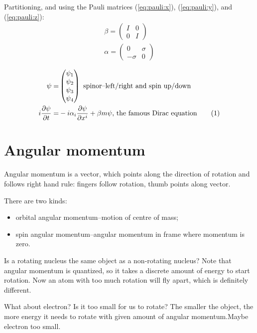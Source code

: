 \documentclass[]{article}
\newcommand\numberthis{\addtocounter{equation}{1}\tag{\theequation}}
\begin{document}
Partitioning, and using the Pauli matrices (\ref{eq:pauli:x}), (\ref{eq:pauli:y}), and (\ref{eq:pauli:z}):
\begin{align*}
	\beta = \begin{pmatrix}
		I&0\\
		0&I
	\end{pmatrix}\\
	\alpha = \begin{pmatrix}
		0&\sigma\\
		-\sigma&0
	\end{pmatrix}
\end{align*}

\begin{align*}
	\psi =& \begin{pmatrix}
		\psi_1\\
		\psi_2\\
		\psi_3\\
		\psi_4
	\end{pmatrix} \text{ spinor--left/right and spin up/down}\\
	i \frac{\partial \psi}{\partial t} =& -i \alpha_i \frac{\partial \psi}{\partial x^i} + \beta m \psi \text{, the famous Dirac equation} \numberthis \label{eq:famous:dirac}
\end{align*}


\section{Angular momentum}

Angular momentum is a vector, which points along the direction of rotation and follows right hand rule: fingers follow rotation, thumb points along vector.

There are two kinds:
\begin{itemize}
	\item orbital angular momentum--motion of centre of mass;
	\item spin angular momentum--angular momentum in frame where momentum is zero.
\end{itemize}

Is a rotating nucleus the same object as a non-rotating nucleus? Note that angular momentum is quantized, so it takes a discrete amount of energy to start rotation. Now an atom with too much rotation will fly apart, which is definitely different. 

What about electron? Is it too small for us to rotate? The smaller the object, the more energy it needs to rotate with given amount of angular momentum.Maybe electron too small.
\end{document}
